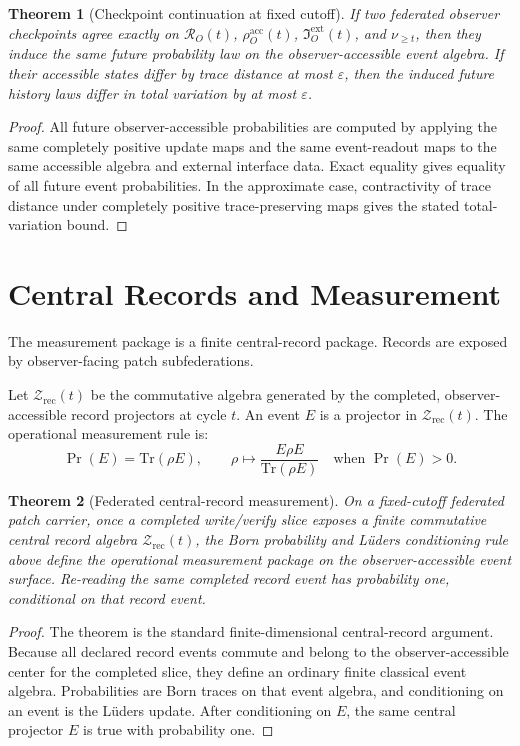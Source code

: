 \documentclass[11pt]{article}
\newtheorem{theorem}{Theorem}[section]
\theoremstyle{remark}
\theoremstyle{plain}
\begin{document}
\begin{theorem}[Checkpoint continuation at fixed cutoff]
If two federated observer checkpoints agree exactly on
\(\mathcal R_O(t)\), \(\rho_O^{\mathrm{acc}}(t)\), \(\mathfrak I_O^{\mathrm{ext}}(t)\), and
\(\nu_{\ge t}\), then they induce the same future probability law on the observer-accessible
event algebra. If their accessible states differ by trace distance at most \(\varepsilon\), then
the induced future history laws differ in total variation by at most \(\varepsilon\).
\end{theorem}

\begin{proof}
All future observer-accessible probabilities are computed by applying the same completely
positive update maps and the same event-readout maps to the same accessible algebra and external
interface data. Exact equality gives equality of all future event probabilities. In the
approximate case, contractivity of trace distance under completely positive trace-preserving maps
gives the stated total-variation bound.
\end{proof}

\section{Central Records and Measurement}

The measurement package is a finite central-record package. Records are exposed by
observer-facing patch subfederations.

Let \(\mathcal Z_{\mathrm{rec}}(t)\) be the commutative algebra generated by the completed,
observer-accessible record projectors at cycle \(t\). An event \(E\) is a projector in
\(\mathcal Z_{\mathrm{rec}}(t)\). The operational measurement rule is:
\[
\Pr(E)=\mathrm{Tr}(\rho E),
\qquad
\rho\mapsto \frac{E\rho E}{\mathrm{Tr}(\rho E)}
\quad\text{when }\Pr(E)>0.
\]

\begin{theorem}[Federated central-record measurement]
On a fixed-cutoff federated patch carrier, once a completed write/verify slice exposes a finite
commutative central record algebra \(\mathcal Z_{\mathrm{rec}}(t)\), the Born probability and
L\"uders conditioning rule above define the operational measurement package on the
observer-accessible event surface. Re-reading the same completed record event has probability
one, conditional on that record event.
\end{theorem}

\begin{proof}
The theorem is the standard finite-dimensional central-record argument. Because all declared
record events commute and belong to the observer-accessible center for the completed slice, they
define an ordinary finite classical event algebra. Probabilities are Born traces on that event
algebra, and conditioning on an event is the L\"uders update. After conditioning on \(E\), the
same central projector \(E\) is true with probability one.
\end{proof}
\end{document}
